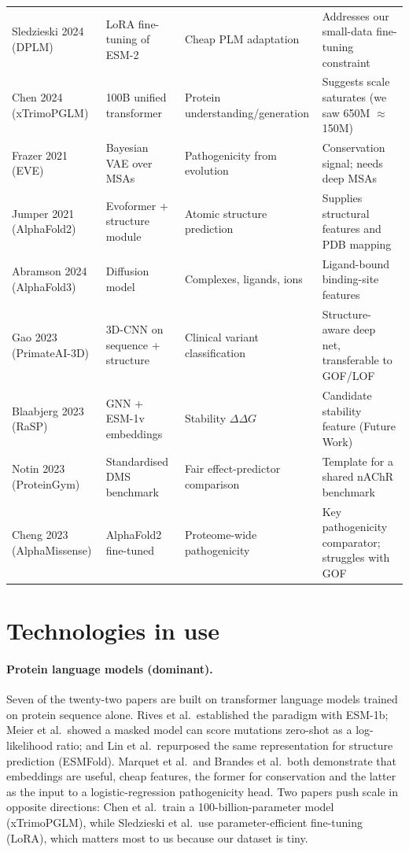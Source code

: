 \documentclass[11pt]{article}
\begin{document}
\begin{table}[ht]
\begin{tabular}{@{}p{3.1cm}p{3.3cm}p{3.4cm}p{4.0cm}@{}}
Sledzieski 2024 (DPLM) & LoRA fine-tuning of ESM-2 & Cheap PLM adaptation & Addresses our small-data fine-tuning constraint \\
Chen 2024 (xTrimoPGLM) & 100B unified transformer & Protein understanding/generation & Suggests scale saturates (we saw 650M $\approx$ 150M) \\
Frazer 2021 (EVE) & Bayesian VAE over MSAs & Pathogenicity from evolution & Conservation signal; needs deep MSAs \\
\midrule
Jumper 2021 (AlphaFold2) & Evoformer + structure module & Atomic structure prediction & Supplies structural features and PDB mapping \\
Abramson 2024 (AlphaFold3) & Diffusion model & Complexes, ligands, ions & Ligand-bound binding-site features \\
\midrule
Gao 2023 (PrimateAI-3D) & 3D-CNN on sequence + structure & Clinical variant classification & Structure-aware deep net, transferable to GOF/LOF \\
Blaabjerg 2023 (RaSP) & GNN + ESM-1v embeddings & Stability $\Delta\Delta G$ & Candidate stability feature (Future Work) \\
\midrule
Notin 2023 (ProteinGym) & Standardised DMS benchmark & Fair effect-predictor comparison & Template for a shared nAChR benchmark \\
Cheng 2023 (AlphaMissense) & AlphaFold2 fine-tuned & Proteome-wide pathogenicity & Key pathogenicity comparator; struggles with GOF \\
\bottomrule
\end{tabular}
\end{table}

\section{Technologies in use}

\paragraph{Protein language models (dominant).}
Seven of the twenty-two papers are built on transformer language models trained
on protein sequence alone. Rives et al.\ established the paradigm with ESM-1b;
Meier et al.\ showed a masked model can score mutations zero-shot as a
log-likelihood ratio; and Lin et al.\ repurposed the same representation for
structure prediction (ESMFold). Marquet et al.\ and Brandes et al.\ both
demonstrate that embeddings are useful, cheap features, the former for
conservation and the latter as the input to a logistic-regression pathogenicity
head. Two papers push scale in opposite directions: Chen et al.\ train a
100-billion-parameter model (xTrimoPGLM), while Sledzieski et al.\ use
parameter-efficient fine-tuning (LoRA), which matters most to us because our
dataset is tiny.
\end{document}
